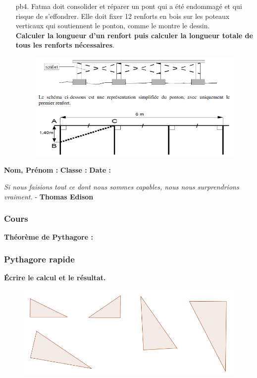\begin{enumerate}
  \item[pb4.] Fatma doit consolider et réparer un pont qui a été endommagé et qui risque de s'effondrer. Elle doit fixer 12 renforts en bois sur les poteaux verticaux qui soutiennent le ponton, comme le montre le dessin. \\
    \textbf{Calculer la longueur d'un renfort puis calculer la longueur totale de tous les renforts nécessaires}. 
  
    \begin{figure}[H]
    \centering
    \includegraphics[width=0.8\linewidth]{4x6-Pythagore/pb4.png}
  \end{figure}
\end{enumerate}

\newpage


\textbf{Nom, Prénom :} \hspace{8cm} \textbf{Classe :} \hspace{3cm} \textbf{Date :}\\

\begin{center}
  \textit{Si nous faisions tout ce dont nous sommes capables, nous nous surprendrions vraiment.}  - \textbf{Thomas Edison}
\end{center}

\subsubsection*{Cours}
\textbf{Théorème de Pythagore : } \dotfill \\
\Pointilles[1]

\subsubsection*{Pythagore rapide}
\textbf{Écrire le calcul et le résultat.}
  
\begin{figure}[H]
  \centering
  \includegraphics[width=0.8\linewidth]{4x6-Pythagore/ex2.png}
\end{figure}

